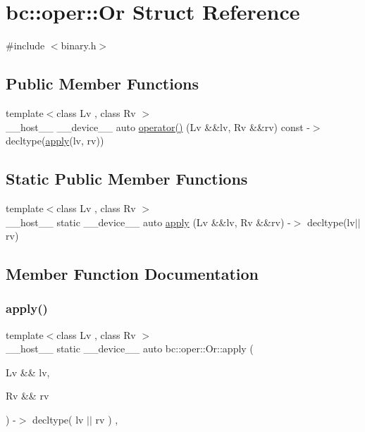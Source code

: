 \hypertarget{structbc_1_1oper_1_1Or}{}\section{bc\+:\+:oper\+:\+:Or Struct Reference}
\label{structbc_1_1oper_1_1Or}


{\ttfamily \#include $<$binary.\+h$>$}

\subsection*{Public Member Functions}
\begin{DoxyCompactItemize}
\item 
{\footnotesize template$<$class Lv , class Rv $>$ }\\\+\_\+\+\_\+host\+\_\+\+\_\+ \+\_\+\+\_\+device\+\_\+\+\_\+ auto \hyperlink{structbc_1_1oper_1_1Or_a135387badff87724b2e866c193b98d60}{operator()} (Lv \&\&lv, Rv \&\&rv) const -\/$>$ decltype(\hyperlink{structbc_1_1oper_1_1Or_a1453c9a745d14b50790518c691646e3b}{apply}(lv, rv))
\end{DoxyCompactItemize}
\subsection*{Static Public Member Functions}
\begin{DoxyCompactItemize}
\item 
{\footnotesize template$<$class Lv , class Rv $>$ }\\\+\_\+\+\_\+host\+\_\+\+\_\+ static \+\_\+\+\_\+device\+\_\+\+\_\+ auto \hyperlink{structbc_1_1oper_1_1Or_a1453c9a745d14b50790518c691646e3b}{apply} (Lv \&\&lv, Rv \&\&rv) -\/$>$ decltype(lv$\vert$$\vert$rv)
\end{DoxyCompactItemize}


\subsection{Member Function Documentation}
\mbox{\label{structbc_1_1oper_1_1Or_a1453c9a745d14b50790518c691646e3b}} 
\subsubsection{\texorpdfstring{apply()}{apply()}}
{\footnotesize\ttfamily template$<$class Lv , class Rv $>$ \\
\+\_\+\+\_\+host\+\_\+\+\_\+ static \+\_\+\+\_\+device\+\_\+\+\_\+ auto bc\+::oper\+::\+Or\+::apply (\begin{DoxyParamCaption}\item[{Lv \&\&}]{lv,  }\item[{Rv \&\&}]{rv }\end{DoxyParamCaption}) -\/$>$ decltype( lv $\vert$$\vert$ rv ) \hspace{0.3cm}{\ttfamily [inline]}, {\ttfamily [static]}}

